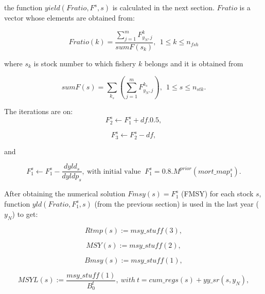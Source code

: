 \documentclass{article}
\begin{document}
the function $yield(Fratio,F^s,s)$ is calculated in the next section. $Fratio$ is a vector whose elements are obtained from:

\begin{equation}\label{fratio1}
    Fratio(k)=\dfrac{\displaystyle\sum_{j=1}^m F^k_{y_N,j}}{sumF(s_k)}, \ \ 1 \leq k \leq n_{fsh}
\end{equation}

where $s_k$ is stock number to which fishery $k$ belongs and it is obtained from  

\begin{equation}
    sumF(s)=\sum_{k_s}\left(\sum_{j=1}^mF^{k_s}_{y_N,j}\right),\ \ 1\leq s  \leq n_{stk}.
\end{equation}

The iterations are on:
\begin{equation}
        F_2^s \leftarrow F_1^s + df.0.5,
\end{equation}

\begin{equation}
        F_3^s\leftarrow F_2^s-df,
\end{equation}

and

\begin{equation}
    F_1^s\leftarrow F_1^s-\dfrac{dyld_s}{dyldp_s}, \ \text{with initial value } \ F_1^s=0.8. M^{prior}(mort\_map^s_1).
\end{equation}


After obtaining the numerical solution $Fmsy(s)=F_1^s$ (FMSY) for each stock $s$, function $yld(Fratio, F_1^s,s)$ (from the previous section) is used in the last year ($y_N$) to get:


\begin{equation}
    Rtmp(s):=msy\_stuff(3),
\end{equation}

\begin{equation}
    MSY(s):=msy\_stuff(2),
\end{equation}

\begin{equation}
    Bmsy(s):=msy\_stuff(1),
\end{equation}

\begin{equation}
    MSYL(s):=\dfrac{msy\_stuff(1)}{B_0^t},\ with \ t=cum\_regs(s)+yy\_sr(s,y_N),
\end{equation}
\end{document}
